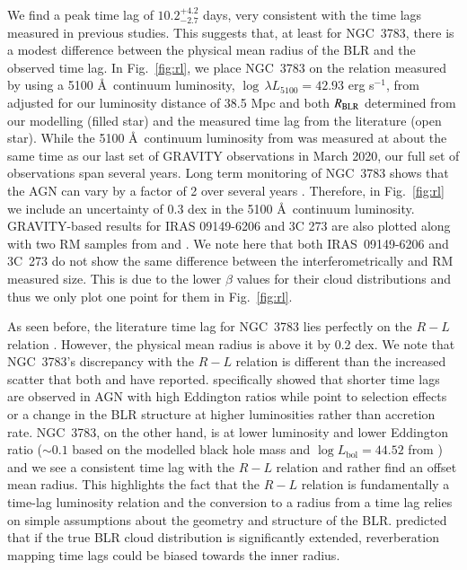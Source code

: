 \documentclass[longauth,]{aa}
\begin{document}
We find a peak time lag of $10.2^{+4.2}_{-2.7}$ days, very consistent with the time lags measured in previous studies. This suggests that, at least for NGC~3783, there is a modest difference between the physical mean radius of the BLR and the observed time lag. In Fig.~\ref{fig:rl}, we place NGC~3783 on the relation measured by \citet{Bentz:2013aa} using a 5100 \AA\ continuum luminosity, $\log\,\lambda L_{5100} = 42.93$ erg s$^{-1}$, from \citet{Bentz:2020aa} adjusted for our luminosity distance of 38.5 Mpc and both $R_{\rm BLR}$ determined from our modelling (filled star) and the measured time lag from the literature (open star). While the 5100 \AA\ continuum luminosity from \citet{Bentz:2020aa} was measured at about the same time as our last set of GRAVITY observations in March 2020, our full set of observations span several years. Long term monitoring of NGC~3783 shows that the AGN can vary by a factor of 2 over several years \citep{lira11}. Therefore, in Fig.~\ref{fig:rl} we include an uncertainty of 0.3 dex in the 5100 \AA\ continuum luminosity. GRAVITY-based results for IRAS 09149-6206 and 3C 273 are also plotted along with two RM samples from \citet{Du:2019aa} and \citet{Grier:2017aa}. We note here that both IRAS~09149-6206 and 3C~273 do not show the same difference between the interferometrically and RM measured size. This is due to the lower $\beta$ values for their cloud distributions and thus we only plot one point for them in Fig.~\ref{fig:rl}.

As seen before, the literature time lag for NGC~3783 lies perfectly on the $R-L$ relation \citep[e.g.][]{Peterson:2004aa,Bentz:2013aa}. However, the physical mean radius is above it by 0.2 dex. We note that NGC~3783's discrepancy with the $R-L$ relation is different than the increased scatter that both \citet{Du:2019aa} and \citet{Grier:2017aa} have reported. \citet{Du:2019aa} specifically showed that shorter time lags are observed in AGN with high Eddington ratios while \citet{Grier:2017aa} point to selection effects or a change in the BLR structure at higher luminosities rather than accretion rate. NGC~3783, on the other hand, is at lower luminosity and lower Eddington ratio ($\sim0.1$ based on the modelled black hole mass and $\log L_{\mathrm{bol}} = 44.52$ from ) and we see a consistent time lag with the $R-L$ relation and rather find an offset mean radius. This highlights the fact that the $R-L$ relation is fundamentally a time-lag luminosity relation and the conversion to a radius from a time lag relies on simple assumptions about the geometry and structure of the BLR. \citet{White:1994aa} predicted that if the true BLR cloud distribution is significantly extended, reverberation mapping time lags could be biased towards the inner radius. 
\end{document}
